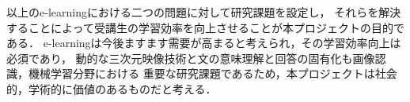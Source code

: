 \documentclass[letterpaper, 12 pt, conference, onecolumn]{ieeeconf}  %
\begin{document}
以上のe-learningにおける二つの問題に対して研究課題を設定し，
それらを解決することによって受講生の学習効率を向上させることが本プロジェクトの目的である．
e-learningは今後ますます需要が高まると考えられ，その学習効率向上は必須であり，
動的な三次元映像技術と文の意味理解と回答の固有化も画像認識，機械学習分野における
重要な研究課題であるため，本プロジェクトは社会的，学術的に価値のあるものだと考える．

% 

% 
% 
% 
% 
% 


% 
% 

% 
% 
\end{document}
